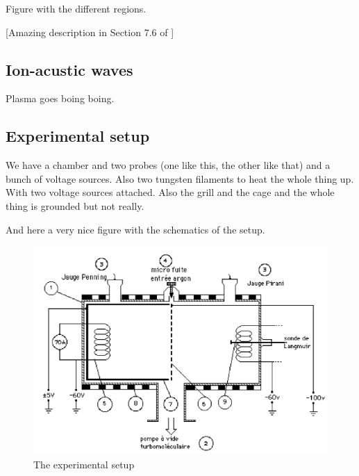 Figure with the different regions.

[Amazing description in Section 7.6 of \cite{piel_plasma_2017}]

\subsection{Ion-acustic waves}
Plasma goes boing boing.

\subsection{Experimental setup}
We have a chamber and two probes (one like this, the other like that) and a bunch of voltage sources.
Also two tungsten filaments to heat the whole thing up.
With two voltage sources attached.
Also the grill and the cage and the whole thing is grounded but not really.

And here a very nice figure with the schematics of the setup.
\begin{figure}
    \centering
    \includegraphics[width=12cm]{figures/experimental-setup.png}
    \caption{The experimental setup}
    \label{fig:experimental_setup}
\end{figure}
